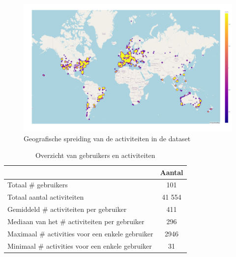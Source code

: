 \begin{figure}[h]
    \centering
    \includegraphics[width=\textwidth]{fig/Afwijkingen&Analyses/Heatmap.png}
    \caption{Geografische spreiding van de activiteiten in de dataset}\label{fig:geographic_spread}
\end{figure}
\begin{table}[h]
    \centering
    \begin{tabular}{|l||c|}
        \hline
                                                         & \textbf{Aantal} \\
        \hline \hline
        Totaal \# gebruikers                             & 101             \\
        \hline
        Totaal aantal activiteiten                       & 41 554          \\
        \hline
        Gemiddeld \# activiteiten per gebruiker          & 411             \\
        \hline
        Mediaan van het \# activiteiten per gebruiker    & 296             \\
        \hline
        Maximaal \# activities voor een enkele gebruiker & 2946            \\
        \hline
        Minimaal \# activities voor een enkele gebruiker & 31              \\
        \hline
    \end{tabular}
    \captionsetup{justification=centering}
    \caption{Overzicht van gebruikers en activiteiten}\label{tab:stats_dataset}
\end{table}
